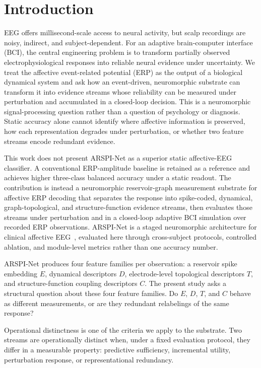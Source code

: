 \documentclass[journal]{IEEEtran}
\begin{document}
\section{Introduction}
EEG offers millisecond-scale access to neural activity, but scalp recordings are noisy, indirect, and subject-dependent. For an adaptive brain-computer interface (BCI), the central engineering problem is to transform partially observed electrophysiological responses into reliable neural evidence under uncertainty. We treat the affective event-related potential (ERP) as the output of a biological dynamical system and ask how an event-driven, neuromorphic substrate can transform it into evidence streams whose reliability can be measured under perturbation and accumulated in a closed-loop decision. This is a neuromorphic signal-processing question rather than a question of psychology or diagnosis. Static accuracy alone cannot identify where affective information is preserved, how each representation degrades under perturbation, or whether two feature streams encode redundant evidence.

This work does not present ARSPI-Net as a superior static affective-EEG classifier. A conventional ERP-amplitude baseline is retained as a reference and achieves higher three-class balanced accuracy under a static readout. The contribution is instead a neuromorphic reservoir-graph measurement substrate for affective ERP decoding that separates the response into spike-coded, dynamical, graph-topological, and structure-function evidence streams, then evaluates those streams under perturbation and in a closed-loop adaptive BCI simulation over recorded ERP observations. ARSPI-Net is a staged neuromorphic architecture for clinical affective EEG~\cite{lane2023arspi,lane2024arspi}, evaluated here through cross-subject protocols, controlled ablation, and module-level metrics rather than one accuracy number.

ARSPI-Net produces four feature families per observation: a reservoir spike embedding $E$, dynamical descriptors $D$, electrode-level topological descriptors $T$, and structure-function coupling descriptors $C$. The present study asks a structural question about these four feature families. Do $E$, $D$, $T$, and $C$ behave as different measurements, or are they redundant relabelings of the same response?

Operational distinctness is one of the criteria we apply to the substrate. Two streams are operationally distinct when, under a fixed evaluation protocol, they differ in a measurable property: predictive sufficiency, incremental utility, perturbation response, or representational redundancy.
\end{document}
